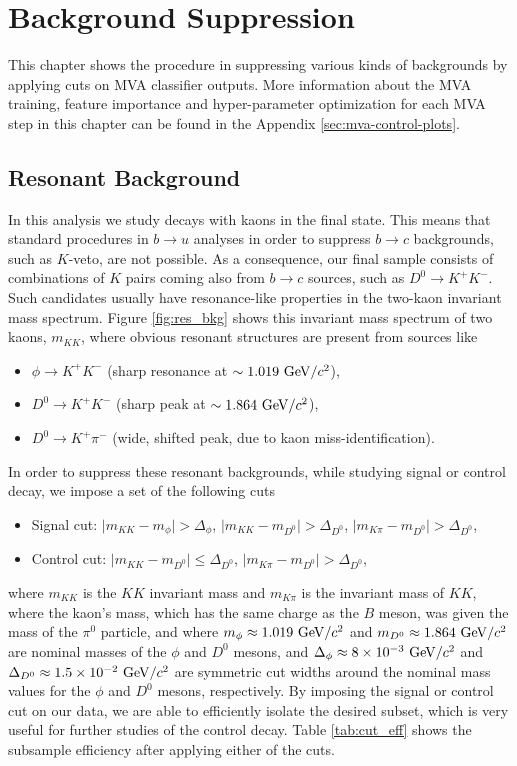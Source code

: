 \chapter{Background Suppression}\label{sec:background-suppression}

This chapter shows the procedure in suppressing various kinds of backgrounds by applying cuts on MVA classifier outputs. More information about the MVA training, feature importance and hyper-parameter optimization for each MVA step in this chapter can be found in the Appendix \ref{sec:mva-control-plots}.

\section{Resonant Background}

In this analysis we study decays with kaons in the final state. This means that standard procedures in $b \to u$ analyses in order to suppress $b \to c$ backgrounds, such as $K$-veto, are not possible. As a consequence, our final sample consists of combinations of $K$ pairs coming also from $b \to c$  sources, such as $D^0 \to K^+ K^-$. Such candidates usually have resonance-like properties in the two-kaon invariant mass spectrum. Figure \ref{fig:res_bkg} shows this invariant mass spectrum of two kaons, $m_{KK}$, where obvious resonant structures are present from sources like
\begin{itemize}
	\item $\phi \to K^+K^-$ (sharp resonance at $\sim1.019\mathrm{~GeV}/c^2$),
	\item $D^0 \to K^+K^-$ (sharp peak at $\sim 1.864\mathrm{~GeV}/c^2$),
	\item $D^0 \to K^+ \pi^-$ (wide, shifted peak, due to kaon miss-identification).
\end{itemize}

In order to suppress these resonant backgrounds, while studying signal or control decay, we impose a set of the following cuts
\begin{itemize}
	\item Signal cut: $\vert m_{KK} - m_{\phi} \vert > \Delta_\phi$, $\vert m_{KK} - m_{D^0} \vert > \Delta_{D^0}$, $\vert m_{K\pi} - m_{D^0} \vert > \Delta_{D^0}$,
	\item Control cut: $\vert m_{KK} - m_{D^0} \vert \leq \Delta_{D^0}$, $\vert m_{K\pi} - m_{D^0} \vert > \Delta_{D^0}$,
\end{itemize}

where $m_{KK}$ is the $KK$ invariant mass and $m_{K\pi}$ is the invariant mass of $KK$, where the kaon's mass, which has the same charge as the $B$ meson, was given the mass of the $\pi^0$ particle, and where $m_\phi \approx 1.019\mathrm{~GeV}/c^2$ and $m_{D^0} \approx 1.864\mathrm{~GeV}/c^2$ are nominal masses of the $\phi$ and $D^0$ mesons, and $\Delta_\phi \approx 8\times 10^{-3}\mathrm{~GeV}/c^2$ and $\Delta_{D^0} \approx 1.5\times 10^{-2}\mathrm{~GeV}/c^2$ are symmetric cut widths around the nominal mass values for the $\phi$ and $D^0$ mesons, respectively. By imposing the signal or control cut on our data, we are able to efficiently isolate the desired subset, which is very useful for further studies of the control decay. Table \ref{tab:cut_eff} shows the subsample efficiency after applying either of the cuts.

